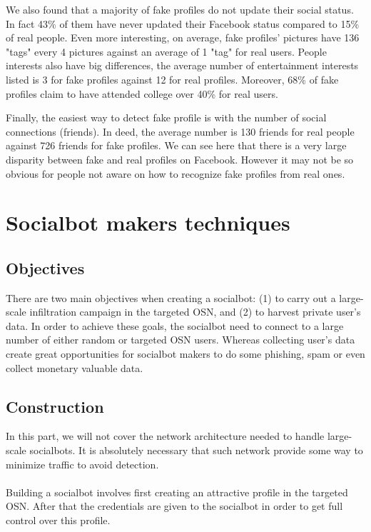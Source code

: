 \documentclass[12pt,a4paper]{article}
\begin{document}
We also found that a majority of fake profiles do not update their social status. In fact 43\%
of them have never updated their Facebook status compared to 15\% of real people. Even more
interesting, on average, fake profiles' pictures have 136 "tags" every 4 pictures against an
average of 1 "tag" for real users. People interests also have big differences, the average
number of entertainment interests listed is 3 for fake profiles against 12 for real profiles.
Moreover, 68\% of fake profiles claim to have attended college over 40\% for real users.

Finally, the easiest way to detect fake profile is with the number of social connections
(friends). In deed, the average number is 130 friends for real people against 726 friends
for fake profiles. We can see here that there is a very large disparity between fake and
real profiles on Facebook. However it may not be so obvious for people not aware on how to
recognize fake profiles from real ones.\cite{facebook_user_profiles}

\section{Socialbot makers techniques}

  \subsection{Objectives}
  There are two main objectives when creating a socialbot: (1) to carry out a large-scale
  infiltration campaign in the targeted OSN, and (2) to harvest private user's data. In order
  to achieve these goals, the socialbot need to connect to a large number of either random or
  targeted OSN users. Whereas collecting user's data create great opportunities for socialbot
  makers to do some phishing, spam or even collect monetary valuable data.

  \subsection{Construction}
  In this part, we will not cover the network architecture needed to handle large-scale
  socialbots. It is absolutely necessary that such network provide some way to minimize
  traffic to avoid detection.\\
  \\
  Building a socialbot involves first creating an attractive profile in the targeted OSN. After
  that the credentials are given to the socialbot in order to get full control over this profile.
\end{document}
